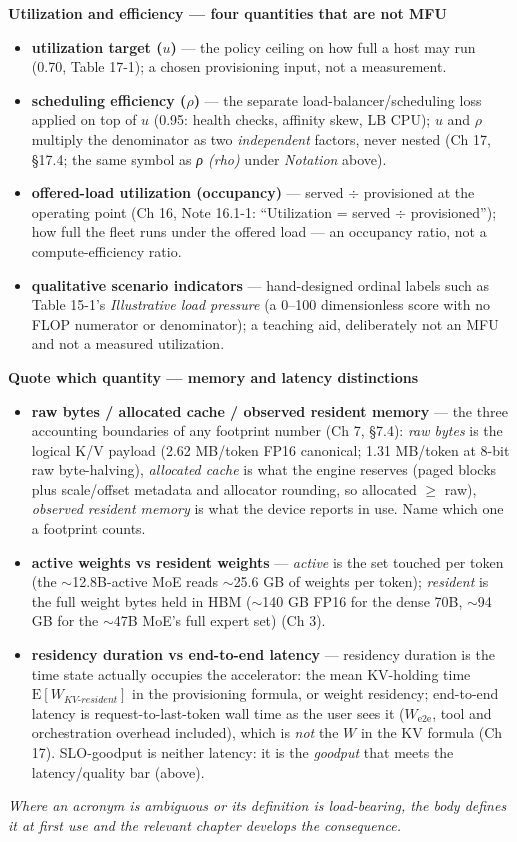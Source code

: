 \noindent\textbf{Utilization and efficiency --- four quantities that are not MFU}
\begin{itemize}\tightlist
\item \textbf{utilization target ($u$)} — the policy ceiling on how full a host may run (0.70, Table 17-1); a chosen provisioning input, not a measurement.
\item \textbf{scheduling efficiency ($\rho$)} — the separate load-balancer/scheduling loss applied on top of $u$ (0.95: health checks, affinity skew, LB CPU); $u$ and $\rho$ multiply the denominator as two \emph{independent} factors, never nested (Ch 17, \S17.4; the same symbol as \emph{ρ (rho)} under \emph{Notation} above).
\item \textbf{offered-load utilization (occupancy)} — served $\div$ provisioned at the operating point (Ch 16, Note 16.1-1: ``Utilization = served $\div$ provisioned''); how full the fleet runs under the offered load --- an occupancy ratio, not a compute-efficiency ratio.
\item \textbf{qualitative scenario indicators} — hand-designed ordinal labels such as Table 15-1's \emph{Illustrative load pressure} (a 0--100 dimensionless score with no FLOP numerator or denominator); a teaching aid, deliberately not an MFU and not a measured utilization.
\end{itemize}

\noindent\textbf{Quote which quantity --- memory and latency distinctions}
\begin{itemize}\tightlist
\item \textbf{raw bytes / allocated cache / observed resident memory} — the three accounting boundaries of any footprint number (Ch 7, \S7.4): \emph{raw bytes} is the logical K/V payload (2.62 MB/token FP16 canonical; 1.31 MB/token at 8-bit raw byte-halving), \emph{allocated cache} is what the engine reserves (paged blocks plus scale/offset metadata and allocator rounding, so allocated $\ge$ raw), \emph{observed resident memory} is what the device reports in use. Name which one a footprint counts.
\item \textbf{active weights vs resident weights} — \emph{active} is the set touched per token (the $\sim$12.8B-active MoE reads $\sim$25.6 GB of weights per token); \emph{resident} is the full weight bytes held in HBM ($\sim$140 GB FP16 for the dense 70B, $\sim$94 GB for the $\sim$47B MoE's full expert set) (Ch 3).
\item \textbf{residency duration vs end-to-end latency} — residency duration is the time state actually occupies the accelerator: the mean KV-holding time $\mathrm{E}[W_{KV\text{-}resident}]$ in the provisioning formula, or weight residency; end-to-end latency is request-to-last-token wall time as the user sees it ($W_{\mathrm{e2e}}$, tool and orchestration overhead included), which is \emph{not} the $W$ in the KV formula (Ch 17). SLO-goodput is neither latency: it is the \emph{goodput} that meets the latency/quality bar (above).
\end{itemize}

\noindent\textit{Where an acronym is ambiguous or its definition is load-bearing, the body defines it at first use and the relevant chapter develops the consequence.}
